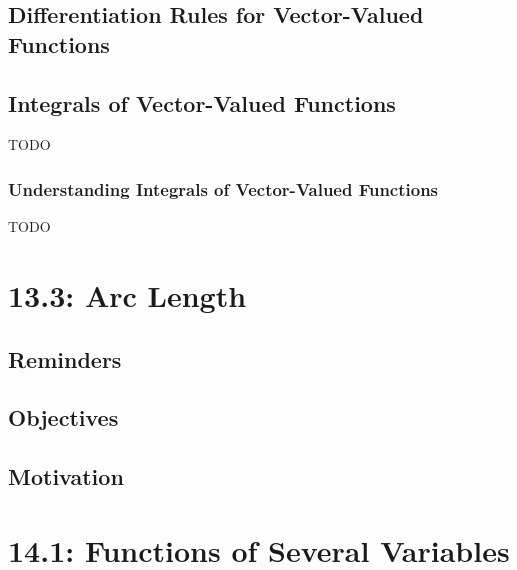 \documentclass{report}
\begin{document}
\begin{sloppypar}
\section{Differentiation Rules for Vector-Valued Functions}
\begin{center}
\end{center}
\section{Integrals of Vector-Valued Functions}
TODO
\subsection{Understanding Integrals of Vector-Valued
  Functions}
TODO

\chapter{13.3: Arc Length}
\section{Reminders}
\section{Objectives}
\section{Motivation}
\chapter{14.1: Functions of Several Variables}

\end{sloppypar}
\end{document}
